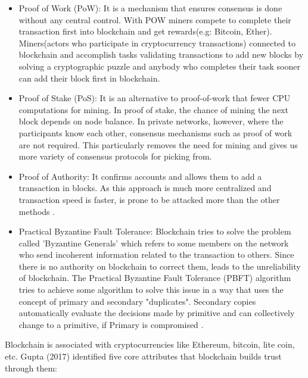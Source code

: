 \begin{itemize}
    \item Proof of Work (PoW): 
    It is a mechanism that ensures consensus is done without any central control. With POW miners compete to complete their transaction first into blockchain and get rewards(e.g: Bitcoin, Ether).\\
    Miners(actors who participate in cryptocurrency transactions) connected to blockchain and accomplish tasks validating transactions to add new blocks by solving a cryptographic puzzle and anybody who completes their task sooner can add their block first in blockchain\cite{Pablo}.
    \item Proof of Stake (PoS): 
    It is an alternative to proof-of-work that fewer CPU computations for mining. In proof of stake, the chance of mining the next block depends on node balance. 
    In private networks, however, where the participants know each other, consensus mechanisms such as proof of work are not required. This particularly removes the need for mining and gives us more variety of consensus protocols for picking from\cite{Christidis}.
    \item Proof of Authority: It confirms accounts and allows them to add a transaction in blocks. As this approach is much more centralized and transaction speed is faster, is prone to be attacked more than the other methods \cite{Luke}.
    \item Practical Byzantine Fault Tolerance: Blockchain tries to solve the problem called 'Byzantine Generals' which refers to some members on the network who send incoherent information related to the transaction to others. Since there is no authority on blockchain to correct them, leads to the unreliability of blockchain. The Practical Byzantine Fault Tolerance (PBFT) algorithm tries to achieve some algorithm to solve this issue in a way that uses the concept of primary and secondary "duplicates". Secondary copies automatically evaluate the decisions made by primitive and can collectively change to a primitive, if Primary is compromised \cite{Luke}.
\end{itemize}
Blockchain is associated with cryptocurrencies like Ethereum, bitcoin, lite coin, etc. Gupta (2017) identified five core attributes that blockchain builds trust through them:
